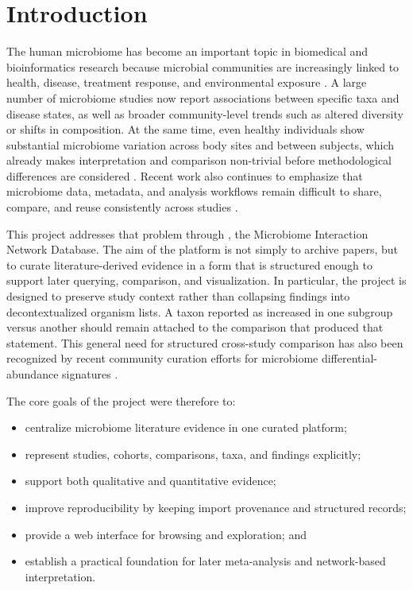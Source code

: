 \section{Introduction}

The human microbiome has become an important topic in biomedical and bioinformatics research because microbial communities are increasingly linked to health, disease, treatment response, and environmental exposure \citep{lynch2016human}. A large number of microbiome studies now report associations between specific taxa and disease states, as well as broader community-level trends such as altered diversity or shifts in composition. At the same time, even healthy individuals show substantial microbiome variation across body sites and between subjects, which already makes interpretation and comparison non-trivial before methodological differences are considered \citep{hmp2012structure}. Recent work also continues to emphasize that microbiome data, metadata, and analysis workflows remain difficult to share, compare, and reuse consistently across studies \citep{huttenhower2023sharing,zass2024toolkit}.

This project addresses that problem through \projectname{}, the Microbiome Interaction Network Database. The aim of the platform is not simply to archive papers, but to curate literature-derived evidence in a form that is structured enough to support later querying, comparison, and visualization. In particular, the project is designed to preserve study context rather than collapsing findings into decontextualized organism lists. A taxon reported as increased in one subgroup versus another should remain attached to the comparison that produced that statement. This general need for structured cross-study comparison has also been recognized by recent community curation efforts for microbiome differential-abundance signatures \citep{geistlinger2024bugsigdb}.

The core goals of the project were therefore to:

\begin{itemize}[leftmargin=1.5em]
    \item centralize microbiome literature evidence in one curated platform;
    \item represent studies, cohorts, comparisons, taxa, and findings explicitly;
    \item support both qualitative and quantitative evidence;
    \item improve reproducibility by keeping import provenance and structured records;
    \item provide a web interface for browsing and exploration; and
    \item establish a practical foundation for later meta-analysis and network-based interpretation.
\end{itemize}

